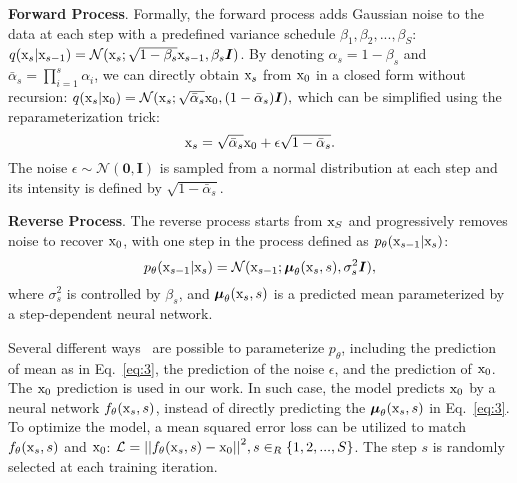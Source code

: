 \documentclass[10pt,twocolumn,letterpaper]{article}
\begin{document}
\textbf{Forward Process}. Formally, the forward process adds Gaussian noise to the data at each step with a predefined variance schedule $\beta_1, \beta_2,..., \beta_S$:
$q(\mathrm{x}_s|\mathrm{x}_{s-1}) = \mathcal{N}(\mathrm{x}_s;\sqrt{1-\beta_s}\mathrm{x}_{s-1},\beta_s \boldsymbol{I})$.
By denoting $\alpha_s = 1 - \beta_s$ and $\bar{\alpha}_s = \prod_{i=1}^{s} \alpha_i$, we can directly obtain $\mathrm{x}_s$ from $\mathrm{x}_0$ in a closed form without recursion:
$q(\mathrm{x}_s|\mathrm{x}_{0}) = \mathcal{N}(\mathrm{x}_s;\sqrt{\bar{\alpha}_s}\mathrm{x}_{0},(1-\bar{\alpha}_s) \boldsymbol{I}),$
which can be simplified using the reparameterization trick:
\begin{equation} \label{eq:2}
\mathrm{x}_s = \sqrt{\bar{\alpha}_s}\mathrm{x}_{0} + \epsilon \sqrt{1-\bar{\alpha}_s}.
\end{equation}
The noise $\epsilon \sim \mathcal{N}(\boldsymbol{0}, \boldsymbol{I})$ is sampled from a normal distribution at each step and its intensity is defined by $\sqrt{1-\bar{\alpha}_s}$.







\textbf{Reverse Process}.
The reverse process starts from $\mathrm{x}_S$ and progressively removes noise to recover $\mathrm{x}_0$, with one step in the process defined as $p_{\theta}(\mathrm{x}_{s-1}|\mathrm{x}_s)$:
\begin{equation} \label{eq:3}
p_\theta(\mathrm{x}_{s-1}|\mathrm{x}_{s}) = \mathcal{N}(\mathrm{x}_{s-1};\boldsymbol{\mu}_\theta(\mathrm{x}_{s},s), \sigma_s^2 \boldsymbol{I}),
\end{equation}
where $\sigma_s^2$ is controlled by $\beta_s$, and $\boldsymbol{\mu}_\theta(\mathrm{x}_{s},s)$ is a predicted mean parameterized by a step-dependent neural network. 




Several different ways~\cite{luo2022understanding} are possible to parameterize $p_\theta$, including the prediction of mean as in Eq.~\ref{eq:3}, the prediction of the noise $\epsilon$, and the prediction of $\mathrm{x}_0$.
The $\mathrm{x}_0$ prediction is used in our work.
In such case, the model predicts $\mathrm{x}_0$ by a neural network $f_{\theta}(\mathrm{x}_{s},s)$, instead of directly predicting the $\boldsymbol{\mu}_\theta(\mathrm{x}_{s},s)$ in Eq.~\ref{eq:3}.
To optimize the model, a mean squared error loss can be utilized to match $f_{\theta}(\mathrm{x}_{s},s)$ and $\mathrm{x}_0$:
$\mathcal{L} = {||f_\theta(\mathrm{x}_{s},s) - \mathrm{x}_{0}||}^2, s \in_R \{1, 2, ..., S\}$.
The step $s$ is randomly selected at each training iteration. 
\end{document}
